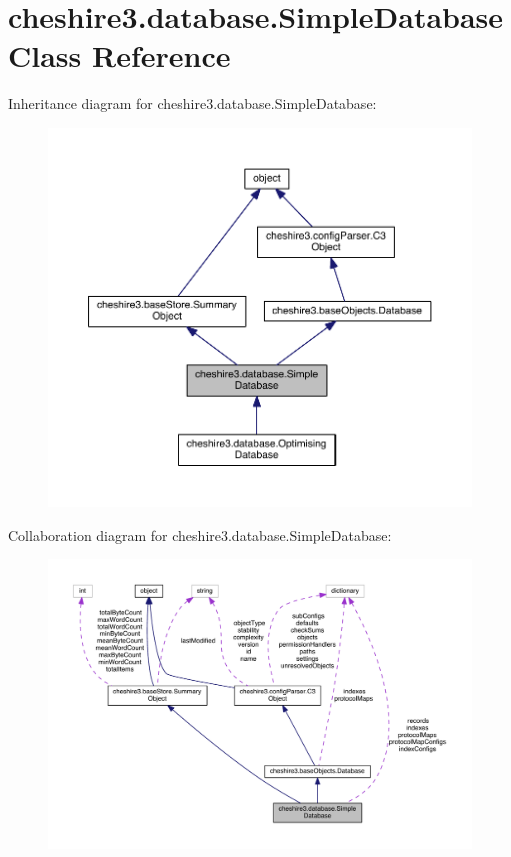 \hypertarget{classcheshire3_1_1database_1_1_simple_database}{\section{cheshire3.\-database.\-Simple\-Database Class Reference}
\label{classcheshire3_1_1database_1_1_simple_database}
}


Inheritance diagram for cheshire3.\-database.\-Simple\-Database\-:
\nopagebreak
\begin{figure}[H]
\begin{center}
\leavevmode
\includegraphics[width=350pt]{classcheshire3_1_1database_1_1_simple_database__inherit__graph}
\end{center}
\end{figure}


Collaboration diagram for cheshire3.\-database.\-Simple\-Database\-:
\nopagebreak
\begin{figure}[H]
\begin{center}
\leavevmode
\includegraphics[width=350pt]{classcheshire3_1_1database_1_1_simple_database__coll__graph}
\end{center}
\end{figure}
